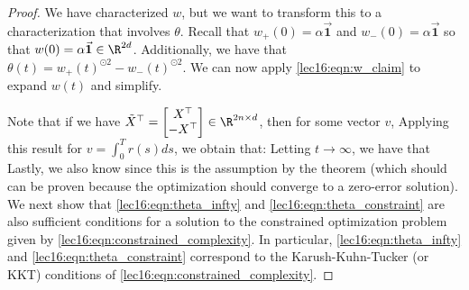 \begin{proof}
We have characterized $w$, but we want to transform this to a characterization that involves $\theta$.
Recall that $w_+(0) = \alpha \vec{\mathbf{1}}$ and $w_-(0) = \alpha \vec{\mathbf{1}}$ so that $w(0) = \alpha \vec{\mathbf{1}} \in \R^{2d}$. Additionally, we have that $\theta(t) = w_+(t)^{\odot 2} - w_-(t)^{\odot 2} $.
We can now apply \eqref{lec16:eqn:w_claim} to expand $w(t)$ and simplify. 

Note that if we have $\tilde{X}^\top = \begin{bmatrix} X^\top \\ -X^\top \end{bmatrix} \in \R^{2n\times d}$, then for some vector $v$,
Applying this result for $v = \int_0^T r(s) ds$, we obtain that:
Letting $t \to \infty$, we have that
Lastly, we also know 
 since this is the assumption by the theorem (which should can be proven because the optimization should converge to a zero-error solution). We next show that \eqref{lec16:eqn:theta_infty} and \eqref{lec16:eqn:theta_constraint} are also sufficient conditions for a solution to the constrained optimization problem given by \eqref{lec16:eqn:constrained_complexity}. In particular, \eqref{lec16:eqn:theta_infty} and \eqref{lec16:eqn:theta_constraint} correspond to the Karush-Kuhn-Tucker (or KKT) conditions of \eqref{lec16:eqn:constrained_complexity}.


\end{proof}
